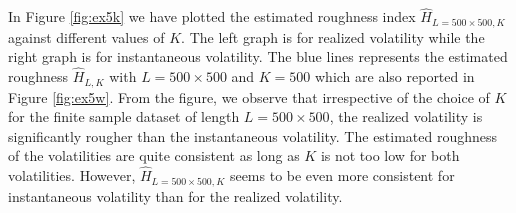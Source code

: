 \documentclass{article}
\begin{document}
In Figure \ref{fig:ex5k} we have plotted the estimated roughness index $\hat{H}_{L=500\times 500,K}$ against different values of $K$. The left graph is for realized volatility while the right graph is for instantaneous volatility. The blue lines represents the estimated roughness $\hat{H}_{L,K}$ with $L=500\times 500$ and $K=500$ which are also reported in Figure \ref{fig:ex5w}. From the figure, we observe that irrespective of the choice of $K$ for the finite sample dataset of length $L=500\times 500$, the realized volatility is significantly rougher than the instantaneous volatility. The estimated roughness of the volatilities are quite consistent as long as $K$ is not too low for both volatilities. However, $\hat{H}_{L=500\times 500,K}$ seems to be even more consistent for instantaneous volatility than for the realized volatility.
\begin{figure}[htbp]
    \centering
    

\end{figure}
\end{document}
